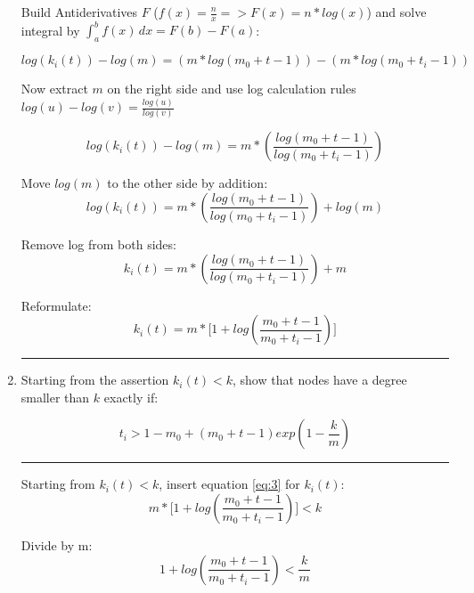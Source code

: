 \begin{enumerate}
	Build Antiderivatives $F$ ($f(x) = \frac{n}{x} => F(x) = n * log(x)$) and solve integral by $\int_{a}^{b} f(x) \,dx = F(b) - F(a)$:
	
	\begin{equation*}
		log(k_i(t)) - log(m) = (m * log(m_0 + t - 1)) - (m * log(m_0 + t_i - 1))
	\end{equation*}
	
	Now extract $m$ on the right side and use log calculation rules $log(u) - log(v) = \frac{log(u)}{log(v)}$
	
	\begin{equation*}
		log(k_i(t)) - log(m) = m * (\frac{log(m_0 + t - 1)}{log(m_0 + t_i - 1)})
	\end{equation*}
	
	Move $log(m)$ to the other side by addition:
	\begin{equation*}
		log(k_i(t)) = m * (\frac{log(m_0 + t - 1)}{log(m_0 + t_i - 1)}) + log(m)
	\end{equation*}

	Remove log from both sides:
	\begin{equation*}
		k_i(t) = m * (\frac{log(m_0 + t - 1)}{log(m_0 + t_i - 1)}) + m
	\end{equation*}

	Reformulate:
	\begin{equation*}
		k_i(t) = m * \biggl[1 + log(\frac{m_0 + t - 1}{m_0 + t_i - 1})\biggr]
	\end{equation*}
	
	\hrule \relax
	
	\item Starting from the assertion $k_i(t) < k$, show that nodes have a degree smaller than $k$ exactly if:
	
	\begin{equation} \label{eq:4}
		t_i > 1 - m_0 + (m_0 + t - 1) exp(1 - \frac{k}{m})
	\end{equation}
	
	\hrule \relax
	
	Starting from $k_i(t) < k$, insert equation \ref{eq:3} for $k_i(t)$:
	\begin{equation*}
		 m * \biggl[1 + log(\frac{m_0 + t - 1}{m_0 + t_i - 1})\biggr] < k
	\end{equation*}
	
	Divide by m:
	\begin{equation*}
		1 + log(\frac{m_0 + t - 1}{m_0 + t_i - 1}) < \frac{k}{m}
	\end{equation*}
	

\end{enumerate}
